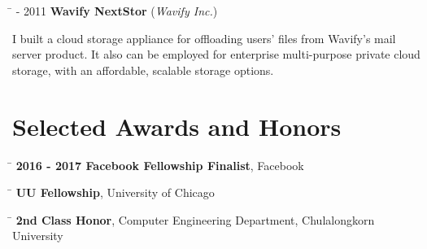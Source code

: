 \documentclass[10pt]{article} %
\begin{document}
\begin{tabbing}
\hspace{2.5cm} \=  - 2011 \>\+ \textbf{Wavify NextStor} (\textit{Wavify Inc.}) \\
\begin{minipage}{\smallertextwidth}
I built a cloud storage appliance for offloading users' files from Wavify's
mail server product. It also can be employed for enterprise multi-purpose
private cloud storage, with an affordable, scalable storage options.
\end{minipage}
\end{tabbing}


\section{Selected Awards and Honors}

\begin{tabbing}
\hspace{2.5cm} \=  \> \textbf{2016 - 2017 Facebook Fellowship Finalist}, Facebook
\end{tabbing}




\begin{tabbing}
\hspace{2.5cm} \=  \> \textbf{UU Fellowship}, University of Chicago
\end{tabbing}

\begin{tabbing}
\hspace{2.5cm} \=  \> \textbf{2nd Class Honor}, Computer Engineering Department, Chulalongkorn University
\end{tabbing}
\end{document}
